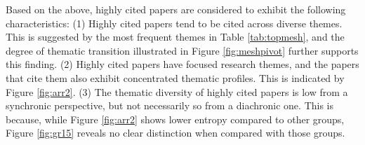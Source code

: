 Based on the above, highly cited papers are considered to exhibit the following characteristics:
(1) Highly cited papers tend to be cited across diverse themes. This is suggested by the most frequent themes in Table \ref{tab:topmesh}, and the degree of thematic transition illustrated in Figure \ref{fig:meshpivot} further supports this finding.
(2) Highly cited papers have focused research themes, and the papers that cite them also exhibit concentrated thematic profiles. This is indicated by Figure \ref{fig:arr2}.
(3) The thematic diversity of highly cited papers is low from a synchronic perspective, but not necessarily so from a diachronic one. This is because, while Figure \ref{fig:arr2} shows lower entropy compared to other groups, Figure \ref{fig:gr15} reveals no clear distinction when compared with those groups.

